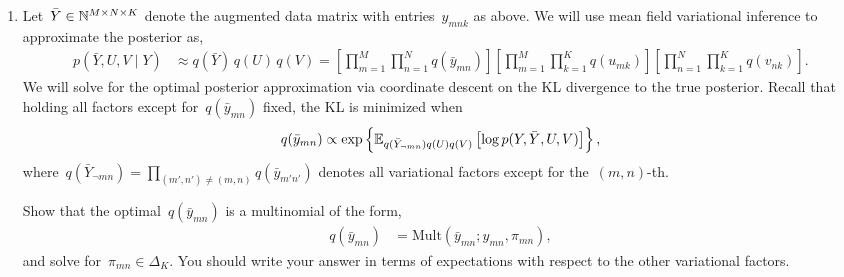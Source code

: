 \begin{enumerate}[label=(\alph*)]
\begin{solution}
\end{solution}

\clearpage
\item Let~$\bar{Y} \in \mathbb{N}^{M \times N \times K}$ denote the augmented data matrix with entries~$y_{mnk}$ as above.  We will use mean field variational inference to approximate the posterior as,
\begin{align*}
    p(\bar{Y}, U, V \mid Y) &\approx q(\bar{Y}) \, q(U) \, q(V) = \left[\prod_{m=1}^M \prod_{n=1}^N q(\bar{y}_{mn}) \right] 
    \left[ \prod_{m=1}^M \prod_{k=1}^K q(u_{mk}) \right] \left[ \prod_{n=1}^N \prod_{k=1}^K q(v_{nk}) \right].
\end{align*}
We will solve for the optimal posterior approximation via coordinate descent on the KL divergence to the true posterior.  Recall that holding all factors except for~$q(\bar{y}_{mn})$ fixed, the KL is minimized when
\begin{align*}
    q(\bar{y}_{mn}) \propto \exp \left\{\mathbb{E}_{q(\bar{Y}_{\neg mn}) q(U) q(V)} \left[ \log p(Y, \bar{Y}, U, V) \right] \right\},
\end{align*}
where~$q(\bar{Y}_{\neg mn}) = \prod_{(m',n') \neq (m,n)} q(\bar{y}_{m'n'})$ denotes all variational factors except for the~$(m,n)$-th.

Show that the optimal~$q(\bar{y}_{mn})$ is a multinomial of the form,
\begin{align*}
    q(\bar{y}_{mn}) &= \mathrm{Mult}(\bar{y}_{mn} ; y_{mn}, \pi_{mn}),
\end{align*}
and solve for~$\pi_{mn} \in \Delta_K$.  You should write your answer in terms of expectations with respect to the other variational factors.


\end{enumerate}
